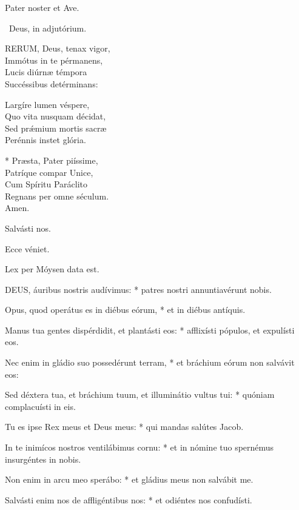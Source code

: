 
Pater noster et Ave.

\V\ Deus, in adjutórium.


\lettrine[lines=2]{R}{ERUM}, Deus, tenax vigor,\\
Immótus in te pérmanens,\\
Lucis diúrnæ témpora\\
Succéssibus detérminans:

Largíre lumen véspere,\\
Quo vita nusquam décidat,\\
Sed prǽmium mortis sacræ\\
Perénnis instet glória.

* Præsta, Pater piíssime,\\
Patríque compar Unice,\\
Cum Spíritu Paráclito\\
Regnans per omne séculum.\\
Amen.

  Salvásti nos.


  Ecce véniet.

  Lex per Móysen data est.


\lettrine[lines=2]{D}{EUS}, áuribus nostris audívimus: * patres nostri annuntiavérunt nobis.

Opus, quod operátus es in diébus eórum, * et in diébus antíquis.

Manus tua gentes dispérdidit, et plantásti eos: * afflixísti pópulos, et expulísti eos.

Nec enim in gládio suo possedérunt terram, * et bráchium eórum non salvávit eos:

Sed déxtera tua, et bráchium tuum, et illuminátio vultus tui: * quóniam complacuísti in eis.

Tu es ipse Rex meus et Deus meus: * qui mandas salútes Jacob.

In te inimícos nostros ventilábimus cornu: * et in nómine tuo spernémus insurgéntes in nobis.

Non enim in arcu meo sperábo: * et gládius meus non salvábit me.

Salvásti enim nos de affligéntibus nos: * et odiéntes nos confudísti.

